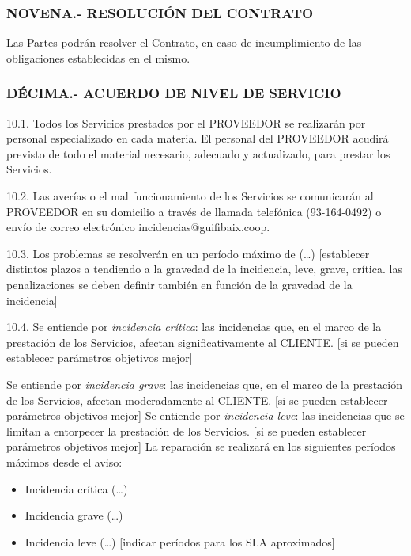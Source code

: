 \documentclass['12pt',spanish,a4paper,]{article}
\begin{document}
\subsubsection{NOVENA.- RESOLUCIÓN DEL
CONTRATO}\label{novena.--resoluciuxf3n-del-contrato}

Las Partes podrán resolver el Contrato, en caso de incumplimiento de las
obligaciones establecidas en el mismo.

\subsubsection{DÉCIMA.- ACUERDO DE NIVEL DE
SERVICIO}\label{duxe9cima.--acuerdo-de-nivel-de-servicio}

10.1. Todos los Servicios prestados por el PROVEEDOR se realizarán por
personal especializado en cada materia. El personal del PROVEEDOR
acudirá previsto de todo el material necesario, adecuado y actualizado,
para prestar los Servicios.

10.2. Las averías o el mal funcionamiento de los Servicios se
comunicarán al PROVEEDOR en su domicilio a través de llamada telefónica
(93-164-0492) o envío de correo electrónico incidencias@guifibaix.coop.

10.3. Los problemas se resolverán en un período máximo de (\ldots{})
{[}establecer distintos plazos a tendiendo a la gravedad de la
incidencia, leve, grave, crítica. las penalizaciones se deben definir
también en función de la gravedad de la incidencia{]}

10.4. Se entiende por \emph{incidencia crítica}: las incidencias que, en
el marco de la prestación de los Servicios, afectan significativamente
al CLIENTE. {[}si se pueden establecer parámetros objetivos mejor{]}

Se entiende por \emph{incidencia grave}: las incidencias que, en el
marco de la prestación de los Servicios, afectan moderadamente al
CLIENTE. {[}si se pueden establecer parámetros objetivos mejor{]} Se
entiende por \emph{incidencia leve}: las incidencias que se limitan a
entorpecer la prestación de los Servicios. {[}si se pueden establecer
parámetros objetivos mejor{]} La reparación se realizará en los
siguientes períodos máximos desde el aviso:

\begin{itemize}
\itemsep1pt\parskip0pt
\item
  Incidencia crítica (\ldots{})
\item
  Incidencia grave (\ldots{})
\item
  Incidencia leve (\ldots{}) {[}indicar períodos para los SLA
  aproximados{]}
\end{itemize}
\end{document}
